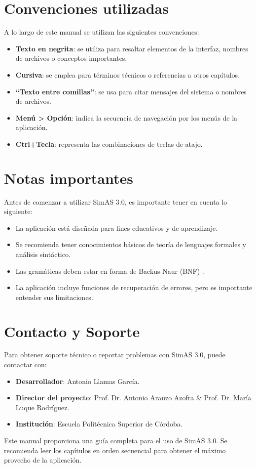 \section{Convenciones utilizadas}

A lo largo de este manual se utilizan las siguientes convenciones:

\begin{itemize}
    \item \textbf{Texto en negrita}: se utiliza para resaltar elementos de la interfaz, nombres de archivos o conceptos importantes.
    \item \textbf{Cursiva}: se emplea para términos técnicos o referencias a otros capítulos.
    \item \textbf{``Texto entre comillas''}: se usa para citar mensajes del sistema o nombres de archivos.
    \item \textbf{Menú > Opción}: indica la secuencia de navegación por los menús de la aplicación.
    \item \textbf{Ctrl+Tecla}: representa las combinaciones de teclas de atajo.
\end{itemize}

\section{Notas importantes}

Antes de comenzar a utilizar SimAS 3.0, es importante tener en cuenta lo siguiente:

\begin{itemize}
    \item La aplicación está diseñada para fines educativos y de aprendizaje.
    \item Se recomienda tener conocimientos básicos de teoría de lenguajes formales y análisis sintáctico.
    \item Las gramáticas deben estar en forma de Backus-Naur (BNF) \cite{bnf}.
    \item La aplicación incluye funciones de recuperación de errores, pero es importante entender sus limitaciones.
\end{itemize}

\section{Contacto y Soporte}

Para obtener soporte técnico o reportar problemas con SimAS 3.0, puede contactar con:

\begin{itemize}
    \item \textbf{Desarrollador}: Antonio Llamas García.
    \item \textbf{Director del proyecto}: Prof. Dr. Antonio Arauzo Azofra \& Prof. Dr. María Luque Rodríguez.
    \item \textbf{Institución}: Escuela Politécnica Superior de Córdoba.
\end{itemize}

Este manual proporciona una guía completa para el uso de SimAS 3.0. Se recomienda leer los capítulos en orden secuencial para obtener el máximo provecho de la aplicación.